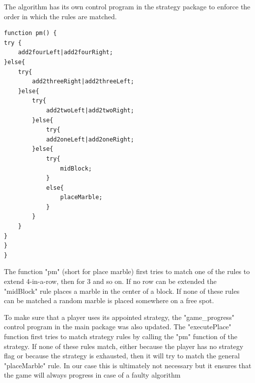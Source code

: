 The algorithm  has its own control program in the strategy package to enforce the order in which the rules are matched.

\begin{lstlisting}
function pm() {
try {
	add2fourLeft|add2fourRight;
}else{
	try{
		add2threeRight|add2threeLeft;
	}else{
		try{
			add2twoLeft|add2twoRight;
		}else{
			try{
			add2oneLeft|add2oneRight;
		}else{
			try{
				midBlock;
			}
			else{
				placeMarble;
			}
		}
	}
}
}
}
\end{lstlisting}
The function "pm" (short for place marble) first tries to match one of the rules to extend 4-in-a-row, then for 3 and so on. If no row can be extended the "midBlock" rule  places a marble in the center of a block. If none of these rules can be matched a random marble is placed somewhere on a free spot.

\vspace{6pt}

To make sure that a player uses its appointed strategy, the "game\_progress" control program in the main package was also updated.
The "executePlace" function first tries to match strategy rules by calling the "pm" function of the strategy. If none of these rules match, either because the player has no strategy flag or because the strategy is exhausted, then it will try to match the general "placeMarble" rule. 
In our case this is ultimately not necessary but it ensures that the game will always progress in case of a faulty algorithm

